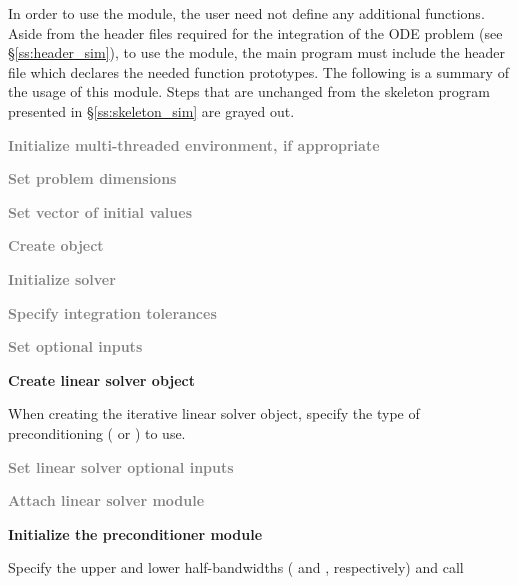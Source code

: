 In order to use the {\cvbandpre} module, the user need not define any
additional functions. 
Aside from the header files required for the integration of the ODE problem
(see \S\ref{ss:header_sim}),  to use the {\cvbandpre} module, the main program 
must include the header file  which declares the needed
function prototypes.
The following is a summary of the usage of this module. Steps that are
unchanged from the skeleton program presented in
\S\ref{ss:skeleton_sim} are grayed out. 
\begin{Steps}
  
\item
  \textcolor{gray}{\bf Initialize multi-threaded environment, if appropriate}
  
\item
  \textcolor{gray}{\bf Set problem dimensions}

\item
  \textcolor{gray}{\bf Set vector of initial values}
 
\item
  \textcolor{gray}{\bf Create {\cvode} object}

\item
  \textcolor{gray}{\bf Initialize {\cvode} solver}

\item
  \textcolor{gray}{\bf Specify integration tolerances}

\item
  \textcolor{gray}{\bf Set optional inputs}

\item
  {\bf Create linear solver object}

  When creating the iterative linear solver object, specify the type
  of preconditioning ( or ) to use.

\item
  \textcolor{gray}{\bf Set linear solver optional inputs}

\item \label{i:bandpre_attach}
  \textcolor{gray}{\bf Attach linear solver module}

\item \label{i:bandpre_init}
  {\bf Initialize the {\cvbandpre} preconditioner module}

  Specify the upper and lower half-bandwidths ( and , respectively) and call 


\end{Steps}

